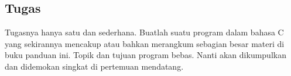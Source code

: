 \documentclass[12pt,]{article}
\begin{document}
	\newpage
	\subsection{Tugas}
	
	Tugasnya hanya satu dan sederhana.
	Buatlah suatu program dalam bahasa C yang sekirannya mencakup atau bahkan merangkum sebagian besar materi di buku panduan ini.
	Topik dan tujuan program bebas.
	Nanti akan dikumpulkan dan didemokan singkat di pertemuan mendatang.
	
\end{document}
